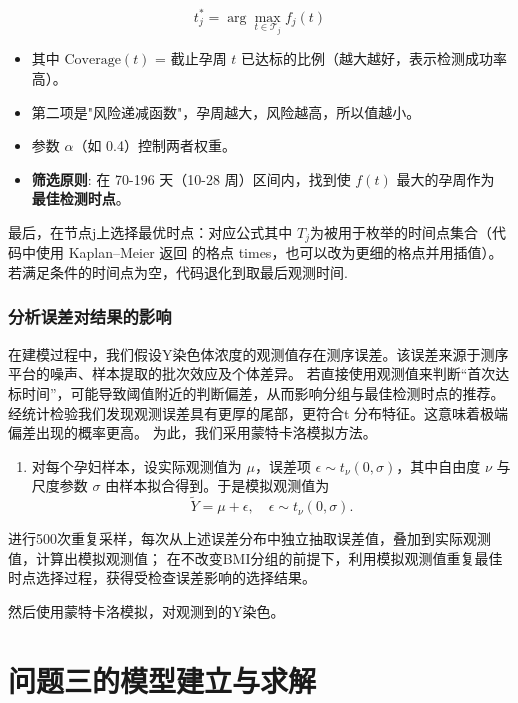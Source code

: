 \documentclass[withoutpreface,notoc]{cumcmthesis}
\begin{document}
	\begin{equation*}
		t_j^* = \arg\max_{t \in \mathcal{T}_j} f_j(t)
	\end{equation*}


\begin{itemize}
    \item 其中 $\text{Coverage}(t)$ = 截止孕周 $t$ 已达标的比例（越大越好，表示检测成功率高）。
    \item 第二项是"风险递减函数"，孕周越大，风险越高，所以值越小。
    \item 参数 $\alpha$（如 0.4）控制两者权重。
    \item \textbf{筛选原则}: 在 70-196 天（10-28 周）区间内，找到使 $f(t)$ 最大的孕周作为 \textbf{最佳检测时点}。
\end{itemize}


最后，在节点j上选择最优时点：{对应公式}其中 $T_j$为被用于枚举的时间点集合（代码中使用 Kaplan–Meier 返回
的格点 times，也可以改为更细的格点并用插值）。若满足条件的时间点为空，代码退化到取最后观测时间.





\subsubsection{分析误差对结果的影响}

在建模过程中，我们假设Y染色体浓度的观测值存在测序误差。该误差来源于测序平台的噪声、样本提取的批次效应及个体差异。
若直接使用观测值来判断“首次达标时间”，可能导致阈值附近的判断偏差，从而影响分组与最佳检测时点的推荐。
经统计检验我们发现观测误差具有更厚的尾部，更符合t 分布特征。这意味着极端偏差出现的概率更高。
为此，我们采用蒙特卡洛模拟方法。

\begin{enumerate}
    \item 对每个孕妇样本，设实际观测值为 $\mu$，误差项 $\epsilon \sim t_\nu(0, \sigma)$，其中自由度 $\nu$ 与尺度参数 $\sigma$ 由样本拟合得到。于是模拟观测值为
    \[
    \tilde{Y} = \mu + \epsilon, \quad \epsilon \sim t_\nu(0, \sigma).
    \]
\end{enumerate}

进行500次重复采样，每次从上述误差分布中独立抽取误差值，叠加到实际观测值，计算出模拟观测值；
在不改变BMI分组的前提下，利用模拟观测值重复最佳时点选择过程，获得受检查误差影响的选择结果。

然后使用蒙特卡洛模拟，对观测到的Y染色。



	\section{问题三的模型建立与求解}
\end{document}
